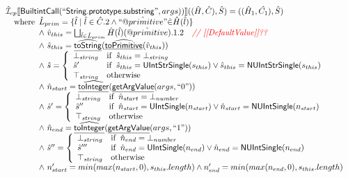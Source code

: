 \documentclass{article}
\makeatletter
\newcommand{\SF}[1]{\mbox{\textsf{#1}}}
\newcommand{\comment}[1]{\textit{#1}}
\newcommand{\wherec}[1]{{\rm where}\begin{array}[t]{l}#1\end{array}}
\newcommand{\ifc}[1]{{\rm if}\begin{array}[t]{l}#1\end{array}}
\newcommand{\owc}{{\rm otherwise}}
\newcommand{\aI}{\hat{\mathcal{I}}}
\newcommand{\lbr}{\llbracket}
\newcommand{\rbr}{\rrbracket}
\newcommand{\hf}[1]{\underline{\sf #1}}
\newcommand{\ahf}[1]{\widehat{\underline{\sf #1}}}
\newcommand{\avarprop}[1]{\hat{@#1}}
\def\inred{\color{red}}
\def\inred{\color{red}}
\makeatother
\begin{document}
\[
\begin{array}{l}

\aI _{cp}\lbr \SF{BuiltintCall}(``\SF{String.prototype.substring}",args))\rbr((\hat{H},\hat{C}), \hat{S})
  = ((\hat{H}_1, \hat{C_1}), \hat{S})\\
\quad\wherec{ 
  \hat{L}_{prim} = \{ \hat{l} \mid \hat{l} \in \hat{C}.2 \land ``\avarprop{primitive}" \dot{\in}\hat{H}(\hat{l}) \}\\
  \land\ \hat{v}_{this} = \bigsqcup_{\hat{l} \in \hat{L}_{prim}} \hat{H}(\hat{l})(\avarprop{primitive}).1.2
    \quad\comment{{\inred // [[DefaultValue]]??}}\\
  \land\ \hat{s}_{this} = \ahf{toString}(\ahf{toPrimitive}(\hat{v}_{this}))\\
  \land\ \hat{s} = \left\{\begin{array}{ll}
      \bot_{string} & \ifc{\hat{s}_{this} = \bot_{string}}\\
      \hat{s}' & \ifc{\hat{s}_{this} = \SF{UIntStrSingle}(s_{this}) \lor \hat{s}_{this} = \SF{NUIntStrSingle}(s_{this}) }\\
      \top_{string} & \owc
    \end{array}\right.\\
  \land\ \hat{n}_{start} = \ahf{toInteger}(\hf{getArgValue}(args, ``0"))\\  
  \land\ \hat{s}' = \left\{\begin{array}{ll}
      \bot_{string} & \ifc{\hat{n}_{start} = \bot_{number}}\\
      \hat{s}'' & \ifc{\hat{n}_{start} = \SF{UIntSingle}(n_{start}) \lor \hat{n}_{start} = \SF{NUIntSingle}(n_{start}) }\\
      \top_{string} & \owc
    \end{array}\right.\\
  \land\ \hat{n}_{end} = \ahf{toInteger}(\hf{getArgValue}(args, ``1"))\\  
  \land\ \hat{s}'' = \left\{\begin{array}{ll}
      \bot_{string} & \ifc{\hat{n}_{end} = \bot_{number}}\\
      \hat{s}''' & \ifc{\hat{n}_{end} = \SF{UIntSingle}(n_{end}) \lor \hat{n}_{end} = \SF{NUIntSingle}(n_{end}) }\\
      \top_{string} & \owc
    \end{array}\right.\\
  \land\ n_{start}'= min(max(n_{start}, 0), s_{this}.length)
  \land n_{end}'= min(max(n_{end}, 0), s_{this}.length)\\
}
\end{array}\]
\end{document}
